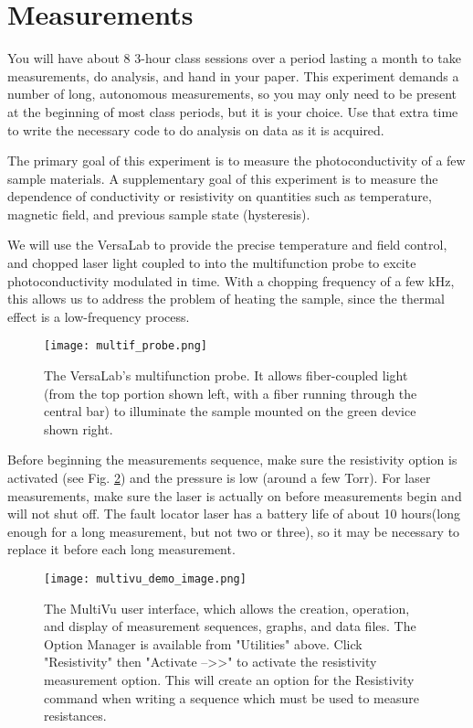 \documentclass{article}
\begin{document}

\section*{Measurements}

You will have about 8 3-hour class sessions over a period lasting a month to take measurements, do analysis, and hand in your paper. This experiment demands a number of long, autonomous measurements, so you may only need to be present at the beginning of most class periods, but it is your choice. Use that extra time to write the necessary code to do analysis on data as it is acquired.

The primary goal of this experiment is to measure the photoconductivity of a few sample materials. A supplementary goal of this experiment is to measure the dependence of conductivity or resistivity on quantities such as temperature, magnetic field, and previous sample state (hysteresis).

We will use the VersaLab to provide the precise temperature and field control, and chopped laser light coupled to into the multifunction probe to excite photoconductivity modulated in time. With a chopping frequency of a few kHz, this allows us to address the problem of heating the sample, since the thermal effect is a low-frequency process.

\begin{figure}
    \centering
    \texttt{[image: multif\_probe.png]}
    \caption{The VersaLab's multifunction probe. It allows fiber-coupled light (from the top portion shown left, with a fiber running through the central bar) to illuminate the sample mounted on the green device shown right.}
    \label{fig:multifunction_probe}
\end{figure}


Before beginning the measurements sequence, make sure the resistivity option is activated (see Fig. \ref{fig:resistivity_option_multivu}) and the pressure is low (around a few Torr). For laser measurements, make sure the laser is actually on before measurements begin and will not shut off. The fault locator laser has a battery life of about 10 hours(long enough for a long measurement, but not two or three), so it may be necessary to replace it before each long measurement. 

\begin{figure}
    \centering
    \texttt{[image: multivu\_demo\_image.png]}
    \caption{The MultiVu user interface, which allows the creation, operation, and display of measurement sequences, graphs, and data files. The Option Manager is available from "Utilities" above. Click "Resistivity" then "Activate -->>" to activate the resistivity measurement option. This will create an option for the Resistivity command when writing a sequence which must be used to measure resistances.}
    \label{fig:resistivity_option_multivu}
\end{figure}
\end{document}
